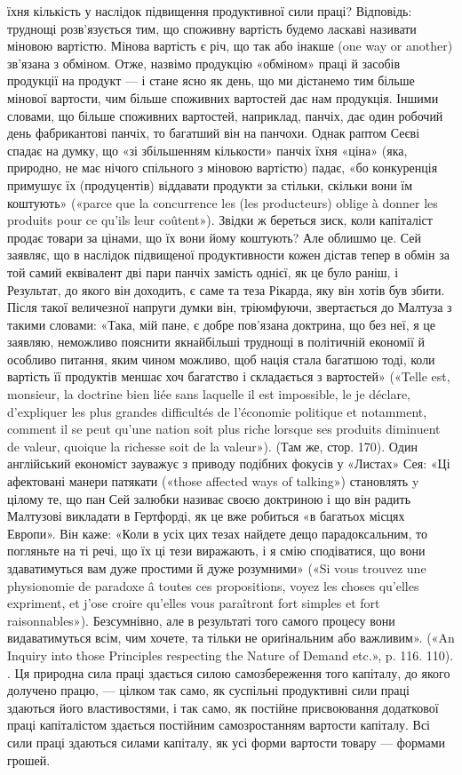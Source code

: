 {їхня кількість у наслідок підвищення продуктивної сили праці? Відповідь:
труднощі розв’язується тим, що споживну вартість будемо ласкаві
називати міновою вартістю. Мінова вартість є річ, що так або інакше
(one way or another) зв’язана з обміном. Отже, назвімо продукцію «обміном»
праці й засобів продукції на продукт — і стане ясно як день, що
ми дістанемо тим більше мінової вартости, чим більше споживних вартостей
дає нам продукція. Іншими словами, що більше споживних вартостей,
наприклад, панчіх, дає один робочий день фабрикантові панчіх,
то багатший він на панчохи. Однак раптом Сеєві спадає на думку, що «зі
збільшенням кількости» панчіх їхня «ціна» (яка, природно, не має нічого
спільного з міновою вартістю) падає, «бо конкуренція примушує їх (продуцентів)
віддавати продукти за стільки, скільки вони їм коштують»
(«parce que la concurrence les (les producteurs) oblige à donner les produits
pour ce qu’ils leur coûtent»). Звідки ж береться зиск, коли капіталіст
продає товари за цінами, що їх вони йому коштують? Але облишмо
це. Сей заявляє, що в наслідок підвищеної продуктивности кожен дістав
тепер в обмін за той самий еквівалент дві пари панчіх замість однієї, як
це було раніш, і~ Результат, до якого він доходить, є саме та теза
Рікарда, яку він хотів був збити. Після такої величезної напруги думки
він, тріюмфуючи, звертається до Малтуза з такими словами: «Така, мій
пане, є добре пов’язана доктрина, що без неї, я це заявляю, неможливо
пояснити якнайбільші труднощі в політичній економії й особливо питання,
яким чином можливо, щоб нація стала багатшою тоді, коли вартість її
продуктів меншає хоч багатство і складається з вартостей» («Telle est,
monsieur, la doctrine bien liée sans laquelle il est impossible, le je déclare,
d’expliquer les plus grandes difficultés de l’économie politique et notamment,
comment il se peut qu’une nation soit plus riche lorsque ses produits
diminuent de valeur, quoique la richesse soit de la valeur»). (Там же, стор.
170). Один англійський економіст зауважує з приводу подібних фокусів
у «Листах» Сея: «Ці афектовані манери патякати («those affected ways
of talking») становлять y цілому те, що пан Сей залюбки називає своєю
доктриною і що він радить Малтузові викладати в Гертфорді, як це вже
робиться «в багатьох місцях Европи». Він каже: «Коли в усіх цих тезах
найдете дещо парадоксальним, то погляньте на ті речі, що їх ці тези виражають,
і я смію сподіватися, що вони здаватимуться вам дуже простими
й дуже розумними» («Si vous trouvez une physionomie de paradoxe â
toutes ces propositions, voyez les choses qu’elles expriment, et j’ose croire
qu’elles vous paraîtront fort simples et fort raisonnables»). Безсумнівно,
але в результаті того самого процесу вони видаватимуться всім, чим хочете,
та тільки не ориґінальним або важливим». («An Inquiry into those
Principles respecting the Nature of Demand etc.», p. 116. 110).
}. Ця природна сила праці здається силою самозбереження
того капіталу, до якого долучено працю, — цілком так само,
як суспільні продуктивні сили праці здаються його властивостями,
і так само, як постійне присвоювання додаткової праці
капіталістом здається постійним самозростанням вартости капіталу.
Всі сили праці здаються силами капіталу, як усі форми
вартости товару — формами грошей.

